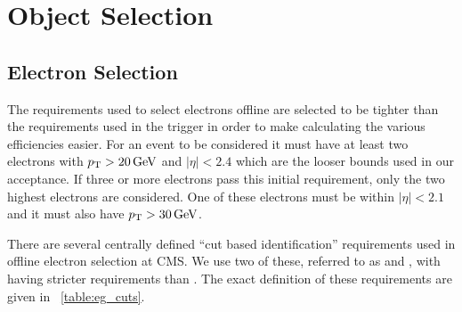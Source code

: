 \section{Object Selection}

\subsection{Electron Selection}
\label{ssec:electron_selection}

The requirements used to select electrons offline are selected to be tighter
than the requirements used in the trigger in order to make calculating the
various efficiencies easier. For an event to be considered it must have at
least two electrons with $p_{\mathrm{T}} > 20 \,\text{Ge\hspace{-.08em}V}$ and $|\eta| < 2.4$ which are the
looser bounds used in our acceptance. If three or more electrons pass this
initial requirement, only the two highest \pt electrons are considered. One of
these electrons must be within $|\eta| < 2.1$ and it must also have $p_{\mathrm{T}} > 30
\,\text{Ge\hspace{-.08em}V}$.

There are several centrally defined ``cut based identification'' requirements
used in offline electron selection at CMS. We use two of these, referred to as
\EGMEDIUM and \EGTIGHT, with \EGTIGHT having stricter requirements than
\EGMEDIUM. The exact definition of these requirements are given in
\TAB~\ref{table:eg_cuts}.

